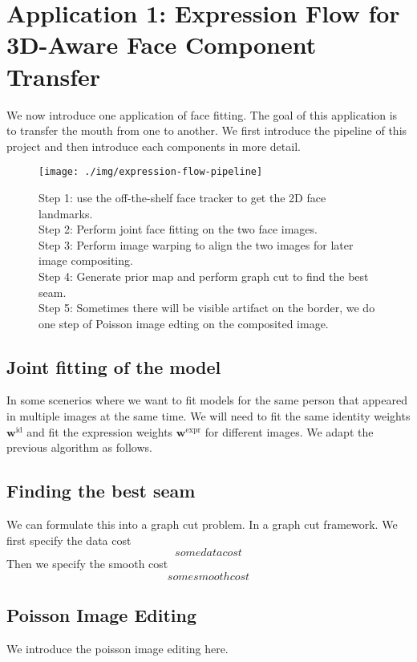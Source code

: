 
\section{Application 1: Expression Flow for 3D-Aware Face
Component Transfer}
We now introduce one application of face fitting. The goal of this application is to transfer the mouth from one to another. We first introduce the pipeline of this project and then introduce each components in more detail.
\begin{figure}[H]
\texttt{[image: ./img/expression-flow-pipeline]}
\caption{Step 1: use the off-the-shelf face tracker to get the 2D face landmarks. \\
Step 2: Perform joint face fitting on the two face images. \\
Step 3: Perform image warping to align the two images for later image compositing. \\
Step 4: Generate prior map and perform graph cut to find the best seam. \\
Step 5: Sometimes there will be visible artifact on the border, we do one step of Poisson image edting on the composited image.}
\end{figure}

\subsection{Joint fitting of the model}
In some scenerios where we want to fit models for the same person that appeared in multiple images at the same time. We will need to fit the same identity weights $\mathbf{w}^{\text{id}}$ and fit the expression weights $\mathbf{w}^{\text{expr}}$ for different images. We adapt the previous algorithm as follows.

\subsection{Finding the best seam}
We can formulate this into a graph cut problem. In a graph cut framework. We first specify the data cost 
$$some data cost$$
Then we specify the smooth cost
$$some smooth cost$$

\subsection{Poisson Image Editing}
We introduce the poisson image editing here.




